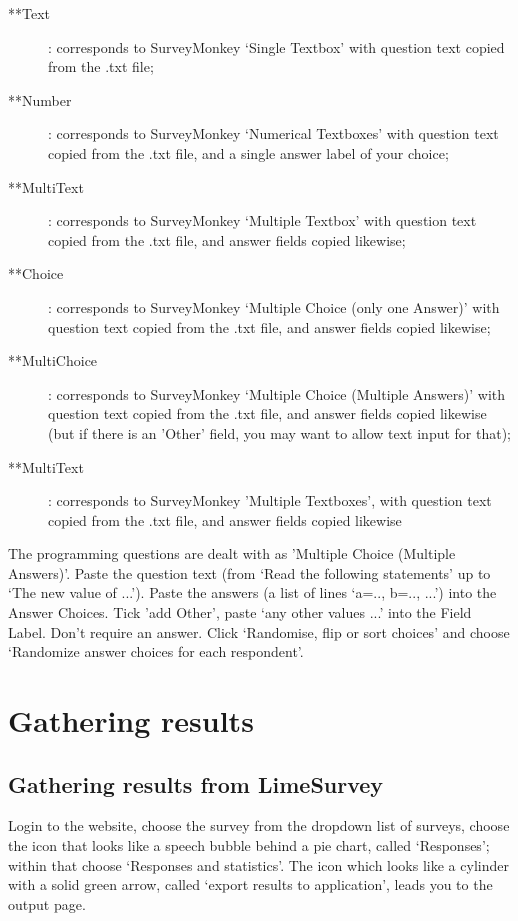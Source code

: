 \documentclass[11pt,a4paper]{article}
\newcommand{\rbsubparagraph}{}
\newcommand{\seclabel}[1]{\label{sec:#1}}
\begin{document}
\begin{description}
\item[**Text]: corresponds to SurveyMonkey `Single Textbox' with question text copied from the {.txt} file;
\item[**Number]: corresponds to SurveyMonkey `Numerical Textboxes' with question text copied from the {.txt} file, and a single answer label of your choice;
\item[**MultiText]: corresponds to SurveyMonkey `Multiple Textbox' with question text copied from the {.txt} file, and answer fields copied likewise;
\item[**Choice]: corresponds to SurveyMonkey `Multiple Choice (only one Answer)' with question text copied from the {.txt} file, and answer fields copied likewise;
\item[**MultiChoice]: corresponds to SurveyMonkey `Multiple Choice (Multiple Answers)' with question text copied from the {.txt} file, and answer fields copied likewise (but if there is an 'Other' field, you may want to allow text input for that);
\item[**MultiText]: corresponds to SurveyMonkey 'Multiple Textboxes', with question text copied from the {.txt} file, and answer fields copied likewise
\end{description}

The programming questions are dealt with as 'Multiple Choice (Multiple Answers)'. Paste the question text (from `Read the following statements' up to `The new value of ...'). Paste the answers (a list of lines `a=.., b=.., ...') into the Answer Choices. Tick 'add Other', paste `any other values ...' into the Field Label. Don't require an answer. Click `Randomise, flip or sort choices' and choose `Randomize answer choices for each respondent'.

\section{Gathering results}
\seclabel{gathering}

\subsection{Gathering results from LimeSurvey}

\rbsubparagraph{}
Login to the website, choose the survey from the dropdown list of surveys, choose the icon that looks like a speech bubble behind a pie chart, called `Responses'; within that choose `Responses and statistics'. The icon which looks like a cylinder with a solid green arrow, called `export results to application', leads you to the output page.
\end{document}
